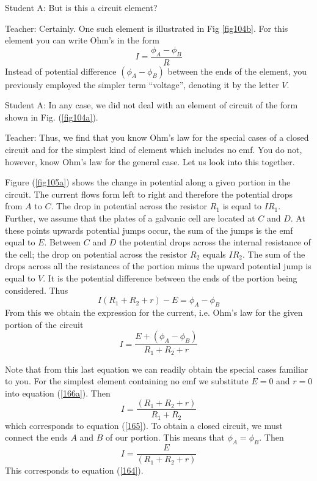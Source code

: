 \documentclass[a4paper,12pt]{book}
\begin{document}
{\sc Student A:} But is this a circuit element?

{\sc Teacher:} Certainly. One such element is illustrated in Fig {\ref{fig104b}}. For this element you can write Ohm's in the form
\begin{equation}
I = \frac{\phi_{A} - \phi_{B}}{R} \label{165}
\end{equation}
Instead of potential difference $(\phi_{A} - \phi_{B})$ between the ends of the element, you previously employed the simpler term ``voltage'', denoting it by the letter $V$.

{\sc Student A:} In any case, we did not deal with an element of circuit of the form shown in Fig. (\ref{fig104a}).

{\sc Teacher:} Thus, we find that you know Ohm's law for the special cases of a closed circuit and for the simplest kind of element which includes no emf. You do not, however, know Ohm's law for the general case. Let us look into this together.

Figure (\ref{fig105a}) shows the change in potential along a given portion in the circuit. The current flows form left to right and therefore the potential drops from $A$ to $C$. The drop in potential across the resistor $R_{1}$ is equal to $IR_{1}$. Further, we assume that the plates of a galvanic cell are located at $C$ and $D$. At these points upwards potential jumps occur, the sum of the jumps is the emf equal to $E$. Between $C$ and $D$ the potential drops across the internal resistance of the cell; the drop on potential across the resistor $R_{2}$ equals $IR_{2}$. The sum of the drops across all the resistances of the portion minus the upward potential jump is equal to $V$. It is the potential difference between the ends of the portion being considered. Thus
\begin{equation*}
I(R_{1}+R_{2}+r) - E=  \phi_{A} - \phi_{B} 
\end{equation*}
From this we obtain the expression for the current, i.e. Ohm's law for the given portion of the circuit 
\begin{equation}
I = \frac{E + (\phi_{A} - \phi_{B})}{R_{1}+R_{2}+r} \label{166a}
\end{equation}

Note that from this last equation we can readily obtain the special cases familiar to you. For the simplest element containing no emf we substitute $E=0$ and $r=0$ into equation (\ref{166a}). Then 
\begin{equation*}
I = \frac{(R_{1}+R_{2}+r)}{R_{1}+R_{2}}
\end{equation*}
which corresponds to equation (\ref{165}). To obtain a closed circuit, we must connect the ends $A$ and $B$ of our portion. This means that  $\phi_{A} = \phi_{B}$. Then 
\begin{equation*}
I = \frac{E}{(R_{1}+R_{2}+r)}
\end{equation*}
This corresponds to equation (\ref{164}).
\end{document}
